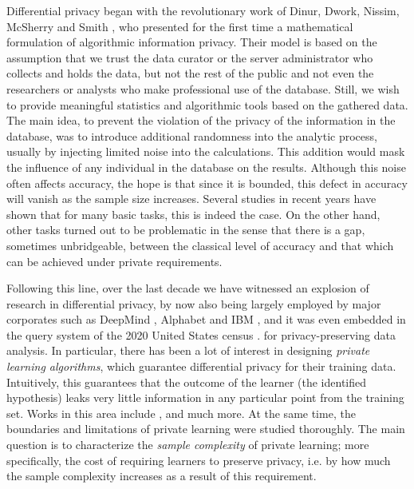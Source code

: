 \documentclass[12pt,a4paper,oneside,onecolumn]{book}
\begin{document}
%
%
Differential privacy began with the revolutionary work of  Dinur, Dwork, Nissim,  McSherry and Smith \citep{dwork2006calibrating, 10.1145/773153.773173}, 
%
%
who presented for the first time a mathematical formulation of algorithmic information privacy. 
Their model is based on the assumption that we trust the data curator or the server administrator who collects and holds the data, but not the rest of the public and not even the researchers or analysts who make professional use of the database. Still, we wish to provide meaningful statistics and algorithmic tools based on the gathered data.
The main idea, to prevent the violation of the privacy of the information in the database, was to introduce additional randomness into the analytic  process, usually by injecting limited noise into the calculations. This addition would mask the influence of any individual in the database on the results. 
Although this noise often affects accuracy, the hope is that since it is bounded, this defect in accuracy will vanish as the sample size increases. 
Several studies in recent years have shown that for many basic tasks, this is indeed the case. On the other hand, other tasks turned out to be problematic in the sense that there is a gap, sometimes unbridgeable, between the classical level of accuracy and that which can be achieved under private requirements.

Following this line, over the last decade we have witnessed an explosion of research in differential privacy, by now also being largely employed by major corporates such as DeepMind \citet{jax-privacy2022github}, Alphabet \citet{DBLP:journals/corr/ErlingssonKP14} and IBM \citet{diffprivlib}, and it was even embedded in the query system of the 2020 United States census \citet{DBLP:journals/corr/abs-2107-10659}.
% 
%
for privacy-preserving data analysis. In particular, there has been a lot of interest in designing \emph{private learning algorithms}, which guarantee differential privacy for their training data. Intuitively, this guarantees that the outcome of the learner (the identified hypothesis) leaks very little information in any particular point from the training set. Works in this area include  \citep{KLNRS08,BBKN12,BNS13,BNS13b,BNS15,BNSV15,FeldmanX15,BunNS19,BeimelMNS19,KaplanMMS19,KaplanLMNS20,AlonBMS20,KaplanMST20,BunLM20,AlonLMM19}, and much more.
At the same time, the boundaries and limitations of private learning were studied thoroughly.
The main question is to characterize the \emph{sample complexity} of private learning; more specifically, the cost of requiring learners to preserve privacy, i.e. by how much the sample complexity increases as a result of this requirement.
\end{document}
